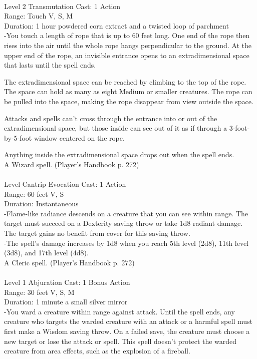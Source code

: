 \documentclass[10pt,twocolumn]{report}
\begin{document}
 \\
Level 2 \quad Transmutation \quad Cast: 1 Action\\
Range: Touch \quad V, S, M\\
Duration: 1 hour \quad powdered corn extract and a twisted loop of parchment\\
-You touch a length of rope that is up to 60 feet long. One end of the rope then rises into the air until the whole rope hangs perpendicular to the ground. At the upper end of the rope, an invisible entrance opens to an extradimensional space that lasts until the spell ends.

The extradimensional space can be reached by climbing to the top of the rope. The space can hold as many as eight Medium or smaller creatures. The rope can be pulled into the space, making the rope disappear from view outside the space.

Attacks and spells can’t cross through the entrance into or out of the extradimensional space, but those inside can see out of it as if through a 3-foot-by-5-foot window centered on the rope.

Anything inside the extradimensional space drops out when the spell ends.\\
A Wizard spell. (Player's Handbook p. 272) \\


 \\
Level Cantrip \quad Evocation \quad Cast: 1 Action\\
Range: 60 feet \quad V, S\\
Duration: Instantaneous \quad \\
-Flame-like radiance descends on a creature that you can see within range. The target must succeed on a Dexterity saving throw or take 1d8 radiant damage. The target gains no benefit from cover for this saving throw.\\
-The spell’s damage increases by 1d8 when you reach 5th level (2d8), 11th level (3d8), and 17th level (4d8).\\
A Cleric spell. (Player's Handbook p. 272) \\


 \\
Level 1 \quad Abjuration \quad Cast: 1 Bonus Action\\
Range: 30 feet \quad V, S, M\\
Duration: 1 minute \quad a small silver mirror\\
-You ward a creature within range against attack.
Until the spell ends, any creature who targets the warded creature with an attack or a harmful spell must first make a Wisdom saving throw. On a failed save, the creature must choose a new target or lose the attack or spell. This spell doesn’t protect the warded creature from area effects, such as the explosion of a fireball.
\end{document}
